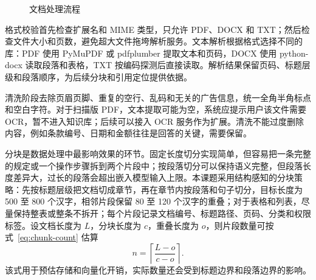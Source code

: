 \begin{figure}[H]
  \centering
  \caption{文档处理流程}
  \label{fig:doc-flow}
\end{figure}

格式校验首先检查扩展名和 MIME 类型，只允许 PDF、DOCX 和 TXT；然后检查文件大小和页数，避免超大文件拖垮解析服务。文本解析根据格式选择不同的库：PDF 使用 PyMuPDF 或 pdfplumber 提取文本和页码，DOCX 使用 python-docx 读取段落和表格，TXT 按编码探测后直接读取。解析结果保留页码、标题层级和段落顺序，为后续分块和引用定位提供依据。

清洗阶段去除页眉页脚、重复的空行、乱码和无关的广告信息，统一全角半角标点和空白字符。对于扫描版 PDF，文本提取可能为空，系统应提示用户该文件需要 OCR，暂不进入知识库；后续可以接入 OCR 服务作为扩展。清洗不能过度删除内容，例如条款编号、日期和金额往往是回答的关键，需要保留。

分块是数据处理中最影响效果的环节。固定长度切分实现简单，但容易把一条完整的规定或一个操作步骤拆到两个片段中；按段落切分可以保持语义完整，但段落长度差异大，过长的段落会超出嵌入模型输入上限。本课题采用结构感知的分块策略：先按标题层级把文档切成章节，再在章节内按段落和句子切分，目标长度为 500 至 800 个汉字，相邻片段保留 80 至 120 个汉字的重叠；对于表格和列表，尽量保持整表或整条不拆开；每个片段记录文档编号、标题路径、页码、分类和权限标签。设文档长度为 $L$，分块长度为 $c$，重叠长度为 $o$，则片段数量可按式~\eqref{eq:chunk-count} 估算
\begin{equation}
  n=\left\lceil\frac{L-o}{c-o}\right\rceil .
  \label{eq:chunk-count}
\end{equation}
该式用于预估存储和向量化开销，实际数量还会受到标题边界和段落边界的影响。

